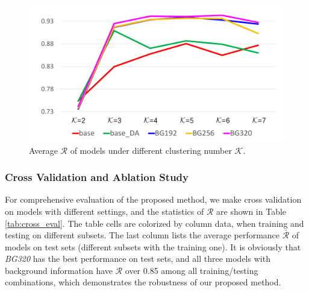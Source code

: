 \documentclass[letterpaper, 10 pt, conference]{ieeeconf}  %
\begin{document}
\begin{figure}[]
	\centering
	\includegraphics[scale=0.28]{kmeans_exp.pdf}
	\caption{Average $\mathcal{R}$ of models under different clustering number $\mathcal{K}$.}
	\label{fig:kmeans_exp}
\end{figure}

\subsubsection{Cross Validation and Ablation Study}

%
%
For comprehensive evaluation of the proposed method, we make cross validation on models with different settings, and the statistics of $\mathcal{R}$ are shown in Table \ref{tab:cross_eval}. The table cells are colorized by column data, when training and testing on different subsets. The last column lists the average performance $\bar{\mathcal{R}}$ of models on test sets (different subsets with the training one). It is obviously that \textit{BG320} has the best performance on test sets, and all three models with background information have $\mathcal{R}$ over 0.85 among all training/testing combinations, which demonstrates the robustness of our proposed method.
\end{document}
